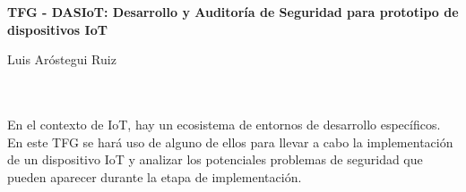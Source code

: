 \thispagestyle{empty}

\begin{center}
{\large\bfseries TFG - DASIoT: Desarrollo y Auditoría de Seguridad para prototipo de dispositivos IoT}\\
\end{center}
\begin{center}
Luis Aróstegui Ruiz\\
\end{center}

\vspace{0.5cm}
\\

\vspace{0.7cm}
\\

En el contexto de IoT, hay un ecosistema de entornos de desarrollo específicos. En este TFG se hará uso de alguno de ellos para llevar a cabo la implementación de un dispositivo IoT y analizar los potenciales problemas de seguridad que pueden aparecer durante la etapa de implementación.


